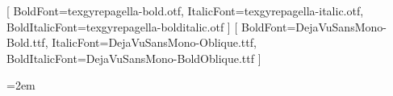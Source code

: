 \usepackage[paperwidth=5in,paperheight=8in,top=0.70in,bottom=0.70in,outer=0.625in,inner=0.75in]{geometry}
\usepackage{fontspec}
\setmainfont{texgyrepagella-regular.otf}[
  BoldFont=texgyrepagella-bold.otf,
  ItalicFont=texgyrepagella-italic.otf,
  BoldItalicFont=texgyrepagella-bolditalic.otf
]
\setmonofont{DejaVuSansMono.ttf}[
  BoldFont=DejaVuSansMono-Bold.ttf,
  ItalicFont=DejaVuSansMono-Oblique.ttf,
  BoldItalicFont=DejaVuSansMono-BoldOblique.ttf
]
\usepackage{microtype}
\usepackage{fancyhdr}
\pagestyle{fancy}
\fancyhf{}
\fancyhead[LE]{\small\leftmark}
\fancyhead[RO]{\small\rightmark}
\fancyfoot[C]{\small\thepage}
\renewcommand{\headrulewidth}{0.4pt}

\setcounter{secnumdepth}{-2}
\setcounter{tocdepth}{1}
\raggedbottom
\emergencystretch=2em
\usepackage{setspace}
\usepackage{fvextra}
